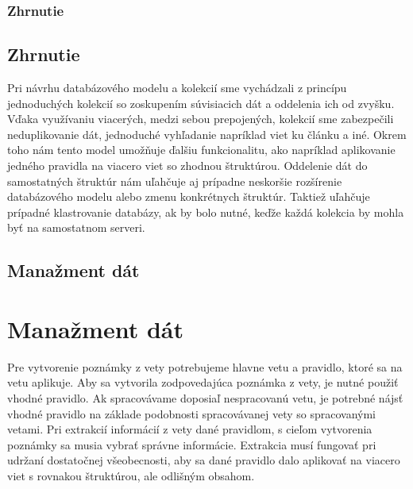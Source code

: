 %
%
{
	\subsubsection{Zhrnutie}
}
{
	\subsection{Zhrnutie}
}
\label{subsubsection:collections_summary}
Pri návrhu databázového modelu a kolekcií sme vychádzali z princípu jednoduchých kolekcií so zoskupením súvisiacich dát a oddelenia ich od zvyšku. Vďaka využívaniu viacerých, medzi sebou prepojených, kolekcií sme zabezpečili neduplikovanie dát, jednoduché vyhľadanie napríklad viet ku článku a iné. Okrem toho nám tento model umožňuje ďalšiu funkcionalitu, ako napríklad aplikovanie jedného pravidla na viacero viet so zhodnou štruktúrou. Oddelenie dát do samostatných štruktúr nám uľahčuje aj prípadne neskoršie rozšírenie databázového modelu alebo zmenu konkrétnych štruktúr. Taktiež uľahčuje prípadné klastrovanie databázy, ak by bolo nutné, keďže každá kolekcia by mohla byť na samostatnom serveri.


%
%
{
	\subsection{Manažment dát}
}
{
	\section{Manažment dát}
}
\label{subsection:data_management}
Pre vytvorenie poznámky z vety potrebujeme hlavne vetu a pravidlo, ktoré sa na vetu aplikuje. Aby sa vytvorila zodpovedajúca poznámka z vety, je nutné použiť vhodné pravidlo. Ak spracovávame doposiaľ nespracovanú vetu, je potrebné nájsť vhodné pravidlo na základe podobnosti spracovávanej vety so spracovanými vetami. Pri extrakcií informácií z vety dané pravidlom, s cieľom vytvorenia poznámky sa musia vybrať správne informácie. Extrakcia musí fungovať pri udržaní dostatočnej všeobecnosti, aby sa dané pravidlo dalo aplikovať na viacero viet s rovnakou štruktúrou, ale odlišným obsahom.

